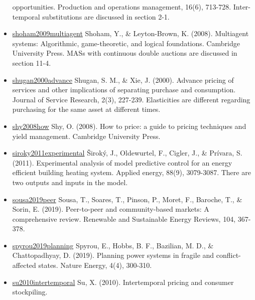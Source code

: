 \documentclass[letterpaper,8pt,twocolumn,twoside,]{pinp}
\begin{document}
\begin{itemize}
  opportunities. Production and operations management, 16(6), 713-728.
  Inter-temporal substitutions are discussed in section 2-1.
\item
  \href{https://www.cambridge.org/core/books/multiagent-systems/B11B69E0CB9032D6EC0A254F59922360}{shoham2009multiagent}
  Shoham, Y., \& Leyton-Brown, K. (2008). Multiagent systems:
  Algorithmic, game-theoretic, and logical foundations. Cambridge
  University Press. MASs with continuous double auctions are discussed
  in section 11-4.
\item
  \href{https://journals.sagepub.com/doi/abs/10.1177/109467050023001?casa_token=nHdK2gtk0ZUAAAAA:JZm0jvC2O9C0qr7WPZZphEZINBT2hpYCLNSB5hykwAO1buCHLim0JzlleOeUOwCv0uIZWbmfE8vI}{shugan2000advance}
  Shugan, S. M., \& Xie, J. (2000). Advance pricing of services and
  other implications of separating purchase and consumption. Journal of
  Service Research, 2(3), 227-239. Elasticities are different regarding
  purchasing for the same asset at different times.
\item
  \href{https://www.cambridge.org/core/books/how-to-price/27B182881BC668B688F8DA949DF52554}{shy2008how}
  Shy, O. (2008). How to price: a guide to pricing techniques and yield
  management. Cambridge University Press.
\item
  \href{https://www.sciencedirect.com/science/article/pii/S0306261911001668}{siroky2011experimental}
  Široký, J., Oldewurtel, F., Cigler, J., \& Prívara, S. (2011).
  Experimental analysis of model predictive control for an energy
  efficient building heating system. Applied energy, 88(9), 3079-3087.
  There are two outputs and inputs in the model.
\item
  \href{https://www.sciencedirect.com/science/article/pii/S1364032119300462}{sousa2019peer}
  Sousa, T., Soares, T., Pinson, P., Moret, F., Baroche, T., \& Sorin,
  E. (2019). Peer-to-peer and community-based markets: A comprehensive
  review. Renewable and Sustainable Energy Reviews, 104, 367-378.
\item
  \href{https://www.nature.com/articles/s41560-019-0346-x}{spyrou2019planning}
  Spyrou, E., Hobbs, B. F., Bazilian, M. D., \& Chattopadhyay, D.
  (2019). Planning power systems in fragile and conflict-affected
  states. Nature Energy, 4(4), 300-310.
\item
  \href{https://pubsonline.informs.org/doi/abs/10.1287/opre.1090.0797?casa_token=ToDJ8Q4lVrwAAAAA:PMHqig45Pa7ai5FpOPhTgs-4U8cI_dbkkScDXU9gZBcPngxvOQnVoEJ_qENYKTfUHjLoVAGiwg}{su2010intertemporal}
  Su, X. (2010). Intertemporal pricing and consumer stockpiling.

\end{itemize}
\end{document}
